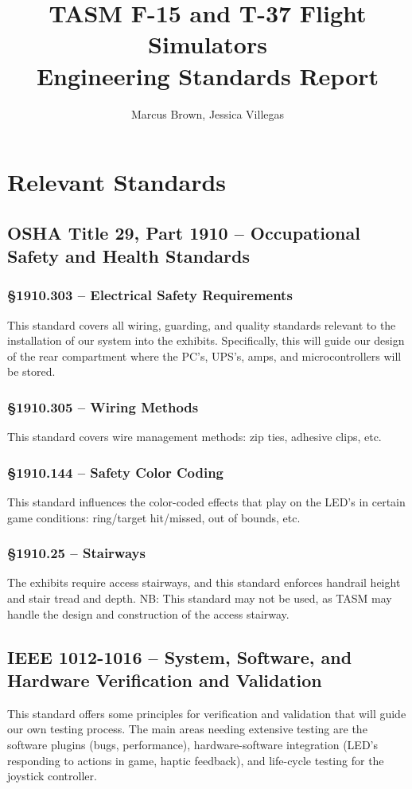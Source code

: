 \documentclass[11pt]{article} %
\title{TASM F-15 and T-37 Flight Simulators\\Engineering Standards Report}
\author{Marcus Brown, Jessica Villegas}
\begin{document}
\maketitle
\thispagestyle{empty}

\section{Relevant Standards}

\subsection{OSHA Title 29, Part 1910 -- Occupational Safety and Health Standards}

\subsubsection*{\S 1910.303 -- Electrical Safety Requirements}
This standard covers all wiring, guarding, and quality standards relevant to the installation of our system into the exhibits. Specifically, this will guide our design of the rear compartment where the PC's, UPS's, amps, and microcontrollers will be stored. 

\subsubsection*{\S 1910.305 -- Wiring Methods}
This standard covers wire management methods: zip ties, adhesive clips, etc.

\subsubsection*{\S 1910.144 -- Safety Color Coding}
This standard influences the color-coded effects that play on the LED's in certain game conditions: ring/target hit/missed, out of bounds, etc.

\subsubsection*{\S 1910.25 -- Stairways}
The exhibits require access stairways, and this standard enforces handrail height and stair tread and depth. NB: This standard may not be used, as TASM may handle the design and construction of the access stairway. 

\subsection{IEEE 1012-1016 -- System, Software, and Hardware Verification and Validation}
This standard offers some principles for verification and validation that will guide our own testing process. The main areas needing extensive testing are the software plugins (bugs, performance), hardware-software integration (LED's responding to actions in game, haptic feedback), and life-cycle testing for the joystick controller. 
\end{document}
